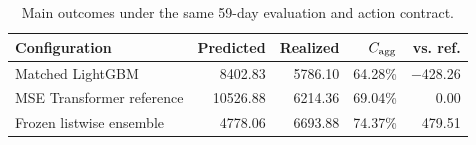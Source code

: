 \begin{table}[!htbp]
\centering\small
\caption{Main outcomes under the same 59-day evaluation and action contract.}\label{tab:main}
\begin{tabularx}{\linewidth}{@{}Xrrrr@{}}
\toprule
Configuration & Predicted & Realized & $C_{\rm agg}$ & vs. ref. \\
\midrule
Matched LightGBM & 8402.83 & 5786.10 & 64.28\% & $-$428.26 \\
MSE Transformer reference & 10526.88 & 6214.36 & 69.04\% & 0.00 \\
Frozen listwise ensemble & 4778.06 & 6693.88 & 74.37\% & 479.51 \\
\bottomrule
\end{tabularx}
\par\vspace{3pt}{\footnotesize Scores are daily means in the original scoring units. The shared oracle mean is 9000.89. Predicted values are not settlements.}
\end{table}
